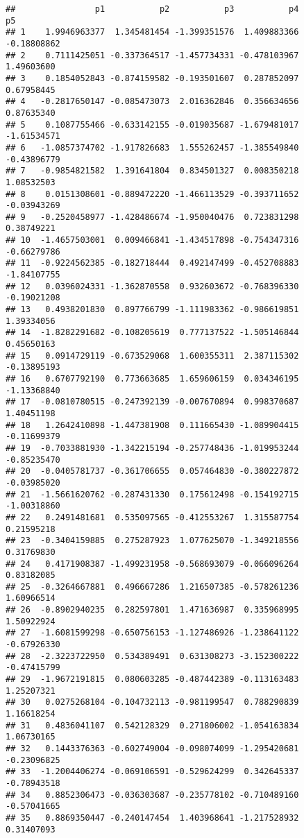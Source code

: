 \documentclass[
]{article}
\begin{document}
\begin{verbatim}
##                p1           p2           p3           p4          p5
## 1    1.9946963377  1.345481454 -1.399351576  1.409883366 -0.18808862
## 2    0.7111425051 -0.337364517 -1.457734331 -0.478103967  1.49603600
## 3    0.1854052843 -0.874159582 -0.193501607  0.287852097  0.67958445
## 4   -0.2817650147 -0.085473073  2.016362846  0.356634656  0.87635340
## 5    0.1087755466 -0.633142155 -0.019035687 -1.679481017 -1.61534571
## 6   -1.0857374702 -1.917826683  1.555262457 -1.385549840 -0.43896779
## 7   -0.9854821582  1.391641804  0.834501327  0.008350218  1.08532503
## 8    0.0151308601 -0.889472220 -1.466113529 -0.393711652 -0.03943269
## 9   -0.2520458977 -1.428486674 -1.950040476  0.723831298  0.38749221
## 10  -1.4657503001  0.009466841 -1.434517898 -0.754347316 -0.66279786
## 11  -0.9224562385 -0.182718444  0.492147499 -0.452708883 -1.84107755
## 12   0.0396024331 -1.362870558  0.932603672 -0.768396330 -0.19021208
## 13   0.4938201830  0.897766799 -1.111983362 -0.986619851  1.39334056
## 14  -1.8282291682 -0.108205619  0.777137522 -1.505146844  0.45650163
## 15   0.0914729119 -0.673529068  1.600355311  2.387115302 -0.13895193
## 16   0.6707792190  0.773663685  1.659606159  0.034346195 -1.13368840
## 17  -0.0810780515 -0.247392139 -0.007670894  0.998370687  1.40451198
## 18   1.2642410898 -1.447381908  0.111665430 -1.089904415 -0.11699379
## 19  -0.7033881930 -1.342215194 -0.257748436 -1.019953244 -0.85235470
## 20  -0.0405781737 -0.361706655  0.057464830 -0.380227872 -0.03985020
## 21  -1.5661620762 -0.287431330  0.175612498 -0.154192715 -1.00318860
## 22   0.2491481681  0.535097565 -0.412553267  1.315587754  0.21595218
## 23  -0.3404159885  0.275287923  1.077625070 -1.349218556  0.31769830
## 24   0.4171908387 -1.499231958 -0.568693079 -0.066096264  0.83182085
## 25  -0.3264667881  0.496667286  1.216507385 -0.578261236  1.60966514
## 26  -0.8902940235  0.282597801  1.471636987  0.335968995  1.50922924
## 27  -1.6081599298 -0.650756153 -1.127486926 -1.238641122 -0.67926330
## 28  -2.3223722950  0.534389491  0.631308273 -3.152300222 -0.47415799
## 29  -1.9672191815  0.080603285 -0.487442389 -0.113163483  1.25207321
## 30   0.0275268104 -0.104732113 -0.981199547  0.788290839  1.16618254
## 31   0.4836041107  0.542128329  0.271806002 -1.054163834  1.06730165
## 32   0.1443376363 -0.602749004 -0.098074099 -1.295420681 -0.23096825
## 33  -1.2004406274 -0.069106591 -0.529624299  0.342645337 -0.78943518
## 34   0.8852306473 -0.036303687 -0.235778102 -0.710489160 -0.57041665
## 35   0.8869350447 -0.240147454  1.403968641 -1.217528932  0.31407093

\end{verbatim}
\end{document}
